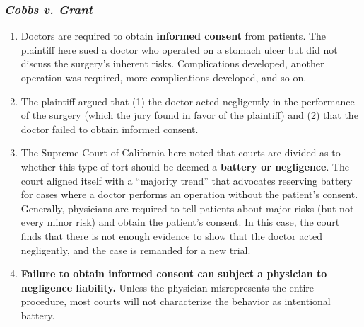 \subsubsection{\emph{Cobbs v. Grant}}

\begin{enumerate}
    \item Doctors are required to obtain \textbf{informed consent} from 
    patients. The plaintiff here sued a doctor who operated on a stomach ulcer 
    but did not discuss the surgery's inherent risks. Complications developed, 
    another operation was required, more complications developed, and so on.
    \item The plaintiff argued that (1) the doctor acted negligently in the 
    performance of the surgery (which the jury found in favor of the 
    plaintiff) and (2) that the doctor failed to obtain informed consent.
    \item The Supreme Court of California here noted that courts are divided 
    as to whether this type of tort should be deemed a \textbf{battery or 
    negligence}. The court aligned itself with a ``majority trend'' that 
    advocates reserving battery for cases where a doctor performs an operation 
    without the patient's consent. Generally, physicians are required to tell 
    patients about major risks (but not every minor risk) and obtain the 
    patient's consent. In this case, the court finds that there is not enough 
    evidence to show that the doctor acted negligently, and the case is 
    remanded for a new trial.
    \item \textbf{Failure to obtain informed consent can subject a physician 
    to negligence liability.} Unless the physician misrepresents the entire 
    procedure, most courts will not characterize the behavior as intentional 
    battery.
\end{enumerate}
